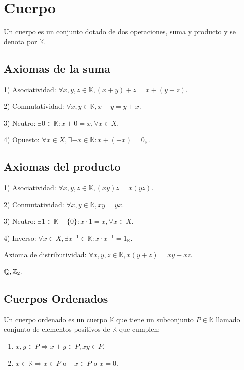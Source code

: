 \section{Cuerpo}

Un cuerpo es un conjunto dotado de dos operaciones, suma y producto y se denota por $\mathbb{K}$.

\subsection{Axiomas de la suma}

1) Asociatividad: $\forall x,y,z \in \mathbb{K}, (x+y)+z=x+(y+z)$.

2) Conmutatividad: $\forall x,y \in \mathbb{K}, x+y=y+x$.

3) Neutro: $\exists 0 \in \mathbb{K} :x+0 = x, \forall x \in X$.

4) Opuesto: $\forall x \in X, \exists -x \in \mathbb{K} : x +(-x) = 0_\mathbb{K}$.

\subsection{Axiomas del producto}

1) Asociatividad: $\forall x,y,z \in \mathbb{K}, (xy)z=x(yz)$.

2) Conmutatividad: $\forall x,y \in \mathbb{K}, xy=yx$.

3) Neutro: $\exists 1 \in \mathbb{K}-\{0\} :x \cdot 1 = x, \forall x \in X$.

4) Inverso: $\forall x \in X, \exists x^{-1} \in \mathbb{K} : x \cdot x^{-1} = 1_\mathbb{K}$.

Axioma de distributividad: $\forall x,y,z \in \mathbb{K}, x(y+z)=xy+xz$.

\begin{eg}
    $\mathbb{Q}, \mathbb{Z}_2$.
\end{eg}

\subsection{Cuerpos Ordenados}

Un cuerpo ordenado es un cuerpo $\mathbb{K}$ que tiene un subconjunto $P \in \mathbb{K}$ llamado conjunto de elementos positivos de $\mathbb{K}$ que cumplen:
\begin{enumerate}
    \item $x,y \in P \Rightarrow x+y \in P, xy \in P$.
    \item $x \in \mathbb{K} \Rightarrow x \in P$ o $-x \in P$ o $x=0$.
\end{enumerate}


